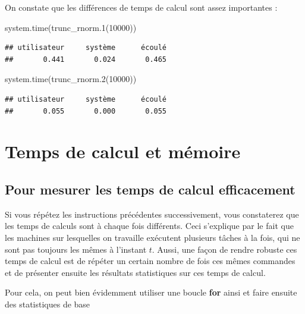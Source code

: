 \documentclass[
]{book}
\newenvironment{Shaded}{\begin{snugshade}}{\end{snugshade}}
\newcommand{\DecValTok}[1]{\textcolor[rgb]{0.00,0.00,0.81}{#1}}
\newcommand{\FunctionTok}[1]{\textcolor[rgb]{0.00,0.00,0.00}{#1}}
\newcommand{\NormalTok}[1]{#1}
\theoremstyle{definition}
\theoremstyle{definition}
\theoremstyle{definition}
\theoremstyle{definition}
\theoremstyle{remark}
\begin{document}
On constate que les différences de temps de calcul sont assez importantes :

\begin{Shaded}
\begin{Highlighting}[]
\FunctionTok{system.time}\NormalTok{(}\FunctionTok{trunc\_rnorm.1}\NormalTok{(}\DecValTok{10000}\NormalTok{))}
\end{Highlighting}
\end{Shaded}

\begin{verbatim}
## utilisateur     système      écoulé 
##       0.441       0.024       0.465
\end{verbatim}

\begin{Shaded}
\begin{Highlighting}[]
\FunctionTok{system.time}\NormalTok{(}\FunctionTok{trunc\_rnorm.2}\NormalTok{(}\DecValTok{10000}\NormalTok{))}
\end{Highlighting}
\end{Shaded}

\begin{verbatim}
## utilisateur     système      écoulé 
##       0.055       0.000       0.055
\end{verbatim}

\hypertarget{temps-de-calcul-et-muxe9moire}{%
\section{Temps de calcul et mémoire}\label{temps-de-calcul-et-muxe9moire}}

\hypertarget{pour-mesurer-les-temps-de-calcul-efficacement}{%
\subsection{Pour mesurer les temps de calcul efficacement}\label{pour-mesurer-les-temps-de-calcul-efficacement}}

Si vous répétez les instructions précédentes successivement, vous constaterez que les temps de calculs sont à chaque fois différents. Ceci s'explique par le fait que les machines sur lesquelles on travaille exécutent plusieurs tâches à la fois, qui ne sont pas toujours les mêmes à l'instant \(t\). Aussi, une façon de rendre robuste ces temps de calcul est de répéter un certain nombre de fois ces mêmes commandes et de présenter ensuite les résultats statistiques sur ces temps de calcul.

Pour cela, on peut bien évidemment utiliser une boucle \textbf{for} ainsi et faire ensuite des statistiques de base
\end{document}
